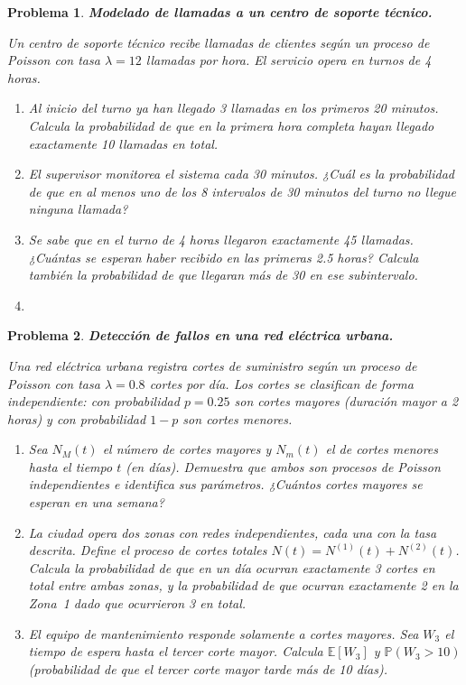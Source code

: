 \documentclass[12pt]{article}
\newtheorem{problem}{Problema}
\begin{document}
\begin{problem}
\textbf{Modelado de llamadas a un centro de soporte técnico.}

Un centro de soporte técnico recibe llamadas de clientes según un proceso de Poisson con tasa $\lambda = 12$ llamadas por hora. El servicio opera en turnos de 4 horas.

\begin{enumerate}
    \item[(a)] Al inicio del turno ya han llegado 3 llamadas en los primeros 20 minutos. Calcula la probabilidad de que en la primera hora completa hayan llegado exactamente 10 llamadas en total. 

    \item[(b)] El supervisor monitorea el sistema cada 30 minutos. ¿Cuál es la probabilidad de que en al menos uno de los 8 intervalos de 30 minutos del turno no llegue ninguna llamada?

    \item[(c)] Se sabe que en el turno de 4 horas llegaron exactamente 45 llamadas. ¿Cuántas se esperan haber recibido en las primeras 2.5 horas? Calcula también la probabilidad de que llegaran más de 30 en ese subintervalo. 
    \item[] 
\end{enumerate}
\end{problem}

\begin{problem}
\textbf{Detección de fallos en una red eléctrica urbana.}

Una red eléctrica urbana registra cortes de suministro según un proceso de Poisson con tasa $\lambda = 0.8$ cortes por día. Los cortes se clasifican de forma independiente: con probabilidad $p = 0.25$ son \emph{cortes mayores} (duración mayor a 2 horas) y con probabilidad $1-p$ son \emph{cortes menores}.

\begin{enumerate}
    \item[(a)] Sea $N_M(t)$ el número de cortes mayores y $N_m(t)$ el de cortes menores hasta el tiempo $t$ (en días). Demuestra que ambos son procesos de Poisson independientes e identifica sus parámetros. ¿Cuántos cortes mayores se esperan en una semana?

    \item[(b)] La ciudad opera dos zonas con redes independientes, cada una con la tasa descrita. Define el proceso de cortes totales $N(t) = N^{(1)}(t) + N^{(2)}(t)$. Calcula la probabilidad de que en un día ocurran exactamente 3 cortes en total entre ambas zonas, y la probabilidad de que ocurran exactamente 2 en la Zona~1 dado que ocurrieron 3 en total.

    \item[(c)] El equipo de mantenimiento responde solamente a cortes mayores. Sea $W_3$ el tiempo de espera hasta el tercer corte mayor. Calcula $\mathbb{E}[W_3]$ y $\mathbb{P}(W_3 > 10)$ (probabilidad de que el tercer corte mayor tarde más de 10 días).
\end{enumerate}
\end{problem}
\end{document}
